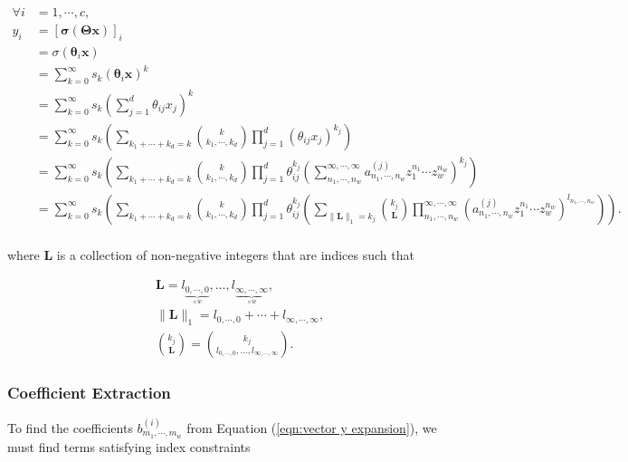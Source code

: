 \begin{align}
    \forall i &= 1, \cdots, c, \nonumber \\ y_i
    &= \left[\mathbf{\sigma}(\mathbf{\Theta} \mathbf{x})\right]_i \nonumber \\
    &= \sigma(\mathbf{\theta}_i \mathbf{x}) \nonumber \\
    &= \sum_{k=0}^{\infty} s_k (\mathbf{\theta}_i \mathbf{x})^k \nonumber \\
    &= \sum_{k=0}^{\infty} s_k \left(\sum_{j=1}^{d} \theta_{ij} x_{j}\right)^k \nonumber \\
    &= \sum_{k=0}^{\infty} s_k \left(\sum_{k_1 + \cdots + k_d = k} \binom{k}{k_1, \cdots, k_d} \prod_{j=1}^{d} (\theta_{ij} x_j)^{k_j} \right) \nonumber \\
    &= \sum_{k=0}^{\infty} s_k \left(\sum_{k_1 + \cdots + k_d = k} \binom{k}{k_1, \cdots, k_d} \prod_{j=1}^{d}\theta_{ij}^{k_j} \left(\sum_{n_1, \cdots, n_w}^{\infty,
    \cdots, \infty} a^{(j)}_{n_1,\cdots,n_w} z_1^{n_1}  \cdots z_w^{n_w} \right)^{k_j}\right) \nonumber \\
    &= \sum_{k=0}^{\infty} s_k \left(\sum_{k_1 + \cdots + k_d = k} \binom{k}{k_1, \cdots, k_d} \prod_{j=1}^{d} \theta_{ij}^{k_j} \left(\sum_{\lVert \mathbf{L} \rVert_1 = k_j} \binom{k_j}{\mathbf{L}} \prod_{n_1, \cdots, n_w}^{\infty, \cdots, \infty} (a^{(j)}_{n_1, \cdots, n_w} z_1^{n_1} \cdots z_w^{n_w})^{l_{n_1, \cdots, n_w}} \right)\right). \nonumber \\
    \label{eqn:vector y expansion}
\end{align}

where $\mathbf{L}$ is a collection of non-negative integers that are indices such that

\begin{align*}
    &\mathbf{L} = l_{\underbrace{0, \cdots, 0}_{\times w}}, \ldots, l_{\underbrace{\infty, \cdots, \infty}_{\times w}}, \\
    &\lVert \mathbf{L} \rVert_1 = l_{0, \cdots, 0} + \cdots + l_{\infty, \cdots, \infty}, \\
    &\binom{k_j}{\mathbf{L}} = \binom{k_j}{l_{0, \cdots, 0}, \ldots, l_{\infty, \cdots, \infty}}.
\end{align*}

\subsubsection{Coefficient Extraction}

To find the coefficients $b^{(i)}_{m_1, \cdots, m_w}$ from Equation (\ref{eqn:vector y expansion}), we must find terms satisfying index constraints

